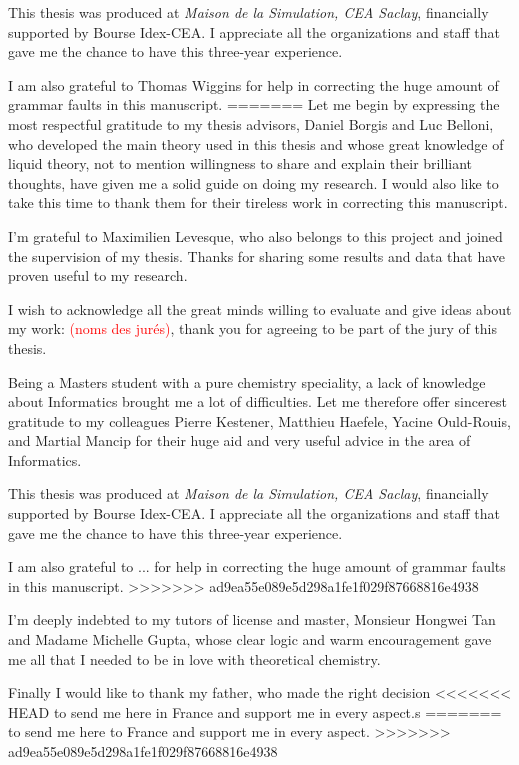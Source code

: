This thesis was produced at\textit{ Maison de la Simulation, CEA Saclay},
financially supported by Bourse Idex-CEA. I appreciate all the organizations
and staff that gave me the chance to have this three-year experience.

I am also grateful to Thomas Wiggins for help in correcting the huge
amount of grammar faults in this manuscript.
=======
Let me begin by expressing the most respectful gratitude to my thesis
advisors, Daniel Borgis and Luc Belloni, who developed the main theory
used in this thesis and whose great knowledge of liquid theory, not to 
mention willingness to share and explain their brilliant thoughts, have 
given me a solid guide on doing my research. I would also like to take 
this time to thank them for their tireless work in correcting this manuscript.

I'm grateful to Maximilien Levesque, who also belongs to this
project and joined the supervision of my thesis. Thanks for sharing
some results and data that have proven useful to my research.

I wish to acknowledge all the great minds willing to evaluate
and give ideas about my work: \textcolor{red}{(noms des jurés)}, thank
you for agreeing to be part of the jury of this thesis.

Being a Masters student with a pure chemistry speciality, a lack
of knowledge about Informatics brought me a lot of difficulties. Let me therefore
offer sincerest gratitude to my colleagues Pierre
Kestener, Matthieu Haefele, Yacine Ould-Rouis, and Martial Mancip
for their huge aid and very useful advice in the area of Informatics.

This thesis was produced at \textit{Maison de la Simulation, CEA Saclay},
financially supported by Bourse Idex-CEA. I appreciate all the
organizations and staff that gave me the chance to have this three-year
experience.

I am also grateful to ... for help in correcting the huge amount of
grammar faults in this manuscript.
>>>>>>> ad9ea55e089e5d298a1fe1f029f87668816e4938

I'm deeply indebted to my tutors of license and master, Monsieur Hongwei
Tan and Madame Michelle Gupta, whose clear logic and warm encouragement
gave me all that I needed to be in love with theoretical chemistry.

Finally I would like to thank my father, who made the right decision
<<<<<<< HEAD
to send me here in France and support me in every aspect.s
=======
to send me here to France and support me in every aspect.
>>>>>>> ad9ea55e089e5d298a1fe1f029f87668816e4938

\endgroup
